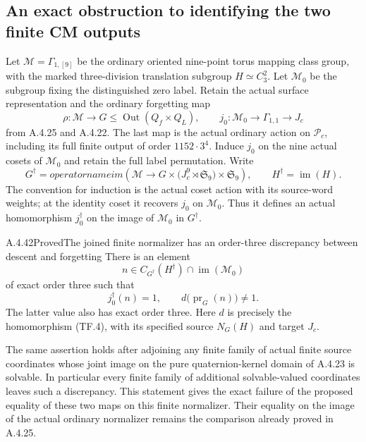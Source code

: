 \subsection{An exact obstruction to identifying the two finite CM outputs}

Let $\mathcal M=\Gamma_{1,[9]}$ be the ordinary oriented
nine-point torus mapping class group, with the marked
three-division translation subgroup $H\simeq C_3^2$.
Let $\mathcal M_0$ be the subgroup fixing the distinguished
zero label.  Retain the actual surface representation
and the ordinary forgetting map
\[
 \rho:\mathcal M\longrightarrow
       G\leq\operatorname{Out}(Q_f\times Q_L),
 \qquad
 j_0:\mathcal M_0\longrightarrow\Gamma_{1,1}
                           \longrightarrow J_c
                                                               \tag{FCD.1}
\]
from A.4.25 and A.4.22.  The last map is the actual
ordinary action on $\mathcal P_c$, including its full
finite output of order $1152\cdot3^4$.
Induce $j_0$ on the nine actual cosets of $\mathcal M_0$
and retain the full label permutation.  Write
\[
 G^\dagger=operatorname{im}\left(
 \mathcal M\longrightarrow
 G\times\bigl(J_c^9\rtimes\mathfrak S_9\bigr)
                    \times\mathfrak S_9\right),
 \qquad H^\dagger=\operatorname{im}(H).
                                                               \tag{FCD.2}
\]
The convention for induction is the actual coset action
with its source-word weights; at the identity coset it
recovers $j_0$ on $\mathcal M_0$.  Thus it defines an
actual homomorphism $j_0^\dagger$ on the image of
$\mathcal M_0$ in $G^\dagger$.

\begin{result}{A.4.42}{Proved}{The joined finite normalizer has an order-three discrepancy between descent and forgetting}
There is an element
\[
 n\in C_{G^\dagger}(H^\dagger)
                     \cap\operatorname{im}(\mathcal M_0)
                                                               \tag{FCD.3}
\]
of exact order three such that
\[
       j_0^\dagger(n)=1,\qquad
       d\bigl(\operatorname{pr}_G(n)\bigr)\ne1.
                                                               \tag{FCD.4}
\]
The latter value also has exact order three.  Here $d$
is precisely the homomorphism (TF.4), with its specified
source $N_G(H)$ and target $J_c$.

The same assertion holds after adjoining any finite
family of actual finite source coordinates whose joint
image on the pure quaternion-kernel domain of A.4.23 is
solvable.  In particular every finite family of additional
solvable-valued coordinates leaves such a discrepancy.
This statement gives the exact failure of the proposed
equality of these two maps on this finite normalizer.
Their equality on the image of the actual ordinary
normalizer remains the comparison already proved in
A.4.25.
\end{result}

